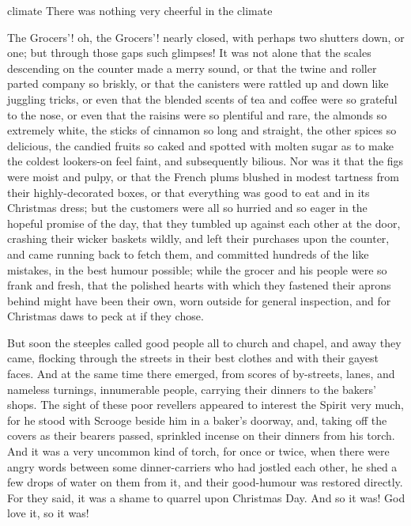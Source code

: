 \begin{bwbigpic}
	[\bigpicsize]
	{climate}
	{There was nothing very cheerful in the climate}
\end{bwbigpic}

The Grocers'! oh, the Grocers'! nearly closed, with perhaps two shutters down, or one; but through those gaps such glimpses! It was not alone that the scales descending on the counter made a merry sound, or that the twine and roller parted company so briskly, or that the canisters were rattled up and down like juggling tricks, or even that the blended scents of tea and coffee were so grateful to the nose, or even that the raisins were so plentiful and rare, the almonds so extremely white, the sticks of cinnamon so long and straight, the other spices so delicious, the candied fruits so caked and spotted with molten sugar as to make the coldest lookers-on feel faint, and subsequently bilious. Nor was it that the figs were moist and pulpy, or that the French plums blushed in modest tartness from their highly-decorated boxes, or that every\-thing was good to eat and in its Christmas dress; but the customers were all so hurried and so eager in the hopeful promise of the day, that they tumbled up against each other at the door, crashing their wicker baskets wildly, and left their purchases upon the counter, and came running back to fetch them, and committed hundreds of the like mistakes, in the best humour possible; while the grocer and his people were so frank and fresh, that the polished hearts with which they fastened their aprons behind might have been their own, worn outside for general inspection, and for Christmas daws to peck at if they chose.


But soon the steeples called good people all to church and chap\-el, and away they came, flocking through the streets in their best  clothes and with their gayest faces. And at the same time there emerged, from scores of by-streets, lanes, and nameless turnings, innumerable people, carrying their dinners to the bakers' shops. The sight of these poor revellers appeared to interest the Spirit very much, for he stood with Scrooge beside him in a baker's doorway, and, taking off the covers as their bearers passed, sprin\-kled incense on their dinners from his torch. And it was a very uncommon kind of torch, for once or twice, when there were angry words between some dinner-carriers who had jostled each other, he shed a few drops of water on them from it, and their good-humour was restored directly. For they said, it was a shame to quarrel upon Christmas Day. And so it was! God love it, so it was!

